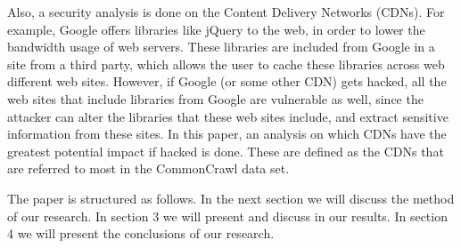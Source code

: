 Also, a security analysis is done on the Content Delivery Networks (CDNs). For example, Google offers libraries like jQuery to the web, in order to lower the bandwidth usage of web servers. These libraries are included from Google in a site from a third party, which allows the user to cache these libraries across web different web sites. However, if Google (or some other CDN) gets hacked, all the web sites that include libraries from Google are vulnerable as well, since the attacker can alter the libraries that these web sites include, and extract sensitive information from these sites. In this paper, an analysis on which CDNs have the greatest potential impact if hacked is done. These are defined as the CDNs that are referred to most in the CommonCrawl data set.

The paper is structured as follows. In the next section we will discuss the method of our research. In section 3 we will present and discuss in our results. In section 4 we will present the conclusions of our research.
